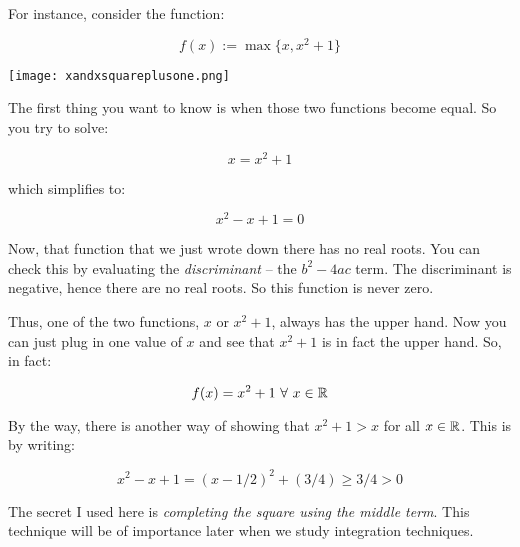 \documentclass{amsart}
\begin{document}
For instance, consider the function:

\begin{equation*}
  f(x) := \max \{ x, x^2 + 1 \}
\end{equation*}

\texttt{[image: xandxsquareplusone.png]}

The first thing you want to know is when those two functions become equal. So you try to solve:

\begin{equation*}
  x = x^2 + 1
\end{equation*}

which simplifies to:

\begin{equation*}
  x^2 - x + 1 = 0
\end{equation*}

Now, that function that we just wrote down there has no real
roots. You can check this by evaluating the {\em discriminant} -- the
$b^2 - 4ac$ term. The discriminant is negative, hence there are no
real roots. So this function is never zero.

Thus, one of the two functions, $x$ or $x^2 + 1$, always has the upper
hand. Now you can just plug in one value of $x$ and see that $x^2 + 1$
is in fact the upper hand. So, in fact:

\begin{equation*}
  f(x) = x^2 + 1 \ \forall \ x \in \mathbb{R}
\end{equation*}

By the way, there is another way of showing that $x^2 + 1 > x$ for all
$x \in \mathbb{R}$. This is by writing:

\begin{equation*}
  x^2 - x + 1 = (x - 1/2)^2 + (3/4) \ge 3/4 > 0
\end{equation*}

The secret I used here is {\em completing the square using the middle
term}. This technique will be of importance later when we study
integration techniques.
\end{document}

